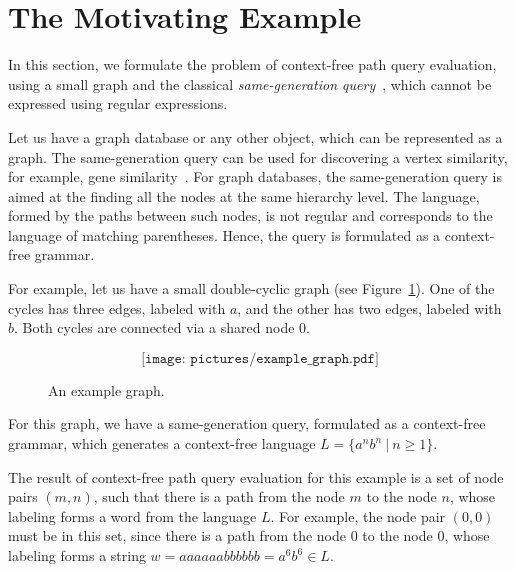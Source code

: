 \section{The Motivating Example}
\label{section_motivating}

In this section, we formulate the problem of context-free path query evaluation, using a small graph and the classical \emph{same-generation query}~\cite{FndDB}, which cannot be expressed using regular expressions.

Let us have a graph database or any other object, which can be represented as a graph. The same-generation query can be used for discovering a vertex similarity, for example, gene similarity~\cite{GraphQueryWithEarley}. For graph databases, the same-generation query is aimed at the finding all the nodes at the same hierarchy level. The language, formed by the paths between such nodes, is not regular and corresponds to the language of matching parentheses. Hence, the query is formulated as a context-free grammar.

For example, let us have a small double-cyclic graph (see Figure~\ref{Example_Graph}). One of the cycles has three edges, labeled with $a$, and the other has two edges, labeled with $b$. Both cycles are connected via a shared node $0$.

\begin{figure}[h]
	\[
	\texttt{[image: pictures/example\_graph.pdf]}
	\]
	\caption{An example graph.}
	\label{Example_Graph}
\end{figure}

For this graph, we have a same-generation query, formulated as a context-free grammar, which generates a context-free language \mbox{$L=\{a^n b^n~|~n \geq 1\}$}.

The result of context-free path query evaluation for this example is a set of node pairs \mbox{$(m, n)$}, such that there is a path from the node $m$ to the node $n$, whose labeling forms a word from the language $L$. For example, the node pair \mbox{$(0,0)$} must be in this set, since there is a path from the node $0$ to the node $0$, whose labeling forms a string \mbox{$w = aaaaaabbbbbb = a^6b^6 \in L$}.
